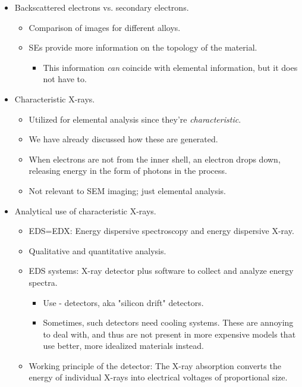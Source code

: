 \documentclass[../notes.tex]{subfiles}
\begin{document}
\begin{itemize}
\begin{itemize}
\begin{itemize}
        \end{itemize}
    \end{itemize}
    \item Backscattered electrons vs. secondary electrons.
    \begin{itemize}
        \item Comparison of images for different alloys.
        \item SEs provide more information on the topology of the material.
        \begin{itemize}
            \item This information \emph{can} coincide with elemental information, but it does not have to.
        \end{itemize}
    \end{itemize}
    \item Characteristic X-rays.
    \begin{itemize}
        \item Utilized for elemental analysis since they're \emph{characteristic}.
        \item We have already discussed how these are generated.
        \item When electrons are not from the inner shell, an electron drops down, releasing energy in the form of photons in the process.
        \item Not relevant to SEM imaging; just elemental analysis.
    \end{itemize}
    \item Analytical use of characteristic X-rays.
    \begin{itemize}
        \item EDS=EDX: Energy dispersive spectroscopy and energy dispersive X-ray.
        \item Qualitative and quantitative analysis.
        \item EDS systems: X-ray detector plus software to collect and analyze energy spectra.
        \begin{itemize}
            \item Use - detectors, aka "silicon drift" detectors.
            \item Sometimes, such detectors need cooling systems. These are annoying to deal with, and thus are not present in more expensive models that use better, more idealized materials instead.
        \end{itemize}
        \item Working principle of the detector: The X-ray absorption converts the energy of individual X-rays into electrical voltages of proportional size.

\end{itemize}
\end{itemize}
\end{document}
